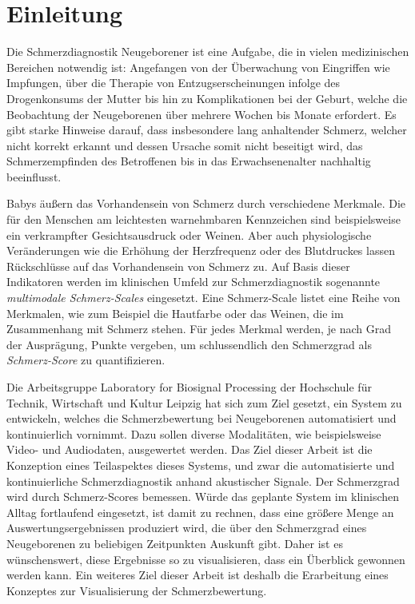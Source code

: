 \chapter{Einleitung}

Die Schmerzdiagnostik Neugeborener ist eine Aufgabe, die in vielen medizinischen Bereichen notwendig ist: Angefangen von der Überwachung von Eingriffen wie Impfungen, über die Therapie von Entzugserscheinungen infolge des Drogenkonsums der Mutter bis hin zu Komplikationen bei der Geburt, welche die Beobachtung der Neugeborenen über mehrere Wochen bis Monate erfordert. Es gibt starke Hinweise darauf, dass insbesondere lang anhaltender Schmerz, welcher nicht korrekt erkannt und dessen Ursache somit nicht beseitigt wird, das Schmerzempfinden des Betroffenen bis in das Erwachsenenalter nachhaltig beeinflusst.\cite[S. 402]{PainAssessment03}

Babys äußern das Vorhandensein von Schmerz durch verschiedene Merkmale. Die für den Menschen am leichtesten warnehmbaren Kennzeichen sind beispielsweise ein verkrampfter Gesichtsausdruck oder Weinen. Aber auch physiologische Veränderungen wie die Erhöhung der Herzfrequenz oder des Blutdruckes lassen Rückschlüsse auf das Vorhandensein von Schmerz zu.\cite[S. 440]{PainAssessment01} Auf Basis dieser Indikatoren werden im klinischen Umfeld zur Schmerzdiagnostik sogenannte \emph{multimodale Schmerz-Scales} eingesetzt. Eine Schmerz-Scale listet eine Reihe von Merkmalen, wie zum Beispiel die Hautfarbe oder das Weinen, die im Zusammenhang mit Schmerz stehen. Für jedes Merkmal werden, je nach Grad der Ausprägung, Punkte vergeben, um schlussendlich den Schmerzgrad als \emph{Schmerz-Score} zu quantifizieren.\cite[S. 406]{PainAssessment03}

Die Arbeitsgruppe \glqq Laboratory for Biosignal Processing\grqq{} der Hochschule für Technik, Wirtschaft und Kultur Leipzig hat sich zum Ziel gesetzt, ein System zu entwickeln, welches die Schmerzbewertung bei Neugeborenen automatisiert und kontinuierlich vornimmt. Dazu sollen diverse Modalitäten, wie beispielsweise Video- und Audiodaten, ausgewertet werden. Das Ziel dieser Arbeit ist die Konzeption eines Teilaspektes dieses Systems, und zwar die automatisierte und kontinuierliche Schmerzdiagnostik anhand akustischer Signale. Der Schmerzgrad wird durch Schmerz-Scores bemessen. Würde das geplante System im klinischen Alltag fortlaufend eingesetzt, ist damit zu rechnen, dass eine größere Menge an Auswertungsergebnissen produziert wird, die über den Schmerzgrad eines Neugeborenen zu beliebigen Zeitpunkten Auskunft gibt. Daher ist es wünschenswert, diese Ergebnisse so zu visualisieren, dass ein Überblick gewonnen werden kann. Ein weiteres Ziel dieser Arbeit ist deshalb die Erarbeitung eines Konzeptes zur Visualisierung der Schmerzbewertung.

